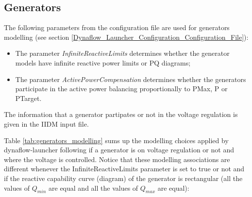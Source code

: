 \documentclass[a4paper, 12pt]{report}
\begin{document}
\subsection{Generators}

The following parameters from the configuration file are used for generators modelling (see section \ref{Dynaflow_Launcher_Configuration_Configuration_File}):
\begin{itemize}
  \item The parameter \textit{InfiniteReactiveLimits} determines whether the generator models have infinite reactive power limits or PQ diagrams;
  \item The parameter \textit{ActivePowerCompensation} determines whether the generators participate in the active power balancing proportionally to PMax, P or PTarget.
\end{itemize}

The information that a generator partipates or not in the voltage regulation is given in the IIDM input file.

\par Table \ref{tab:generators_modelling} sums up the modelling choices applied by dynaflow-launcher following if a generator is on voltage regulation
or not and where the voltage is controlled. Notice that these modelling associations are different whenever the InfiniteReactiveLimits parameter is set to true
or not and if the reactive capability curve (diagram) of the generator is rectangular (all the values of $Q_{min}$ are equal and all the values of $Q_{max}$ are equal):
\end{document}
